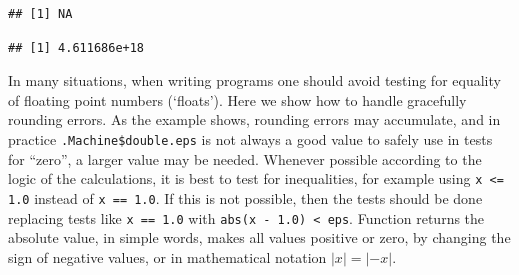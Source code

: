 \documentclass[krantz2]{krantz}\usepackage{knitr}%
\begin{document}
\begin{explainbox}
\begin{knitrout}
\begin{kframe}
{\ttfamily\noindent\color{warningcolor}{\#\# Warning in 2147483600L * 2147483600L: NAs produced by integer overflow}}\begin{verbatim}
## [1] NA
\end{verbatim}
\begin{alltt}
\hlopt{^}
\end{alltt}
\begin{verbatim}
## [1] 4.611686e+18
\end{verbatim}
\end{kframe}
\end{knitrout}
\end{explainbox}

\begin{warningbox}
In many situations, when writing programs one should avoid testing for equality of floating point numbers (`floats'). Here we show how to handle gracefully rounding errors. As the example shows, rounding errors may accumulate, and in practice \verb|.Machine$double.eps| is not always a good value to safely use in tests for ``zero'', a larger value may be needed. Whenever possible according to the logic of the calculations, it is best to test for inequalities, for example using \verb|x <= 1.0| instead of \verb|x == 1.0|. If this is not possible, then the tests should be done replacing tests like \verb|x == 1.0| with \verb|abs(x - 1.0) < eps|. Function  returns the absolute value, in simple words, makes all values positive or zero, by changing the sign of negative values, or in mathematical notation $|x| = |-x|$.


\end{warningbox}
\end{document}
